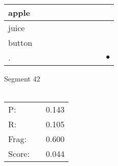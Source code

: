 \documentclass[landscape]{article}
\newcommand{\ssp}{\hspace{2pt}}
\newcommand{\mex}{\cellcolor{g}$\bullet$}
\begin{document}
\begin{tabular}{|l|p{10pt}|p{10pt}|p{10pt}|p{10pt}|p{10pt}|p{10pt}|p{10pt}|p{10pt}|p{10pt}|}
\hline
\ssp apple \ssp&\hspace{2pt}&\hspace{2pt}&\hspace{2pt}&\hspace{2pt}&\hspace{2pt}&\hspace{2pt}&\hspace{2pt}&\hspace{2pt}&\hspace{2pt}\\
\hline
\ssp juice \ssp&\hspace{2pt}&\hspace{2pt}&\hspace{2pt}&\hspace{2pt}&\hspace{2pt}&\hspace{2pt}&\hspace{2pt}&\hspace{2pt}&\hspace{2pt}\\
\hline
\ssp button \ssp&\hspace{2pt}&\hspace{2pt}&\hspace{2pt}&\hspace{2pt}&\hspace{2pt}&\hspace{2pt}&\hspace{2pt}&\hspace{2pt}&\hspace{2pt}\\
\hline
\ssp \cellcolor{ref8}. \ssp&\hspace{2pt}&\hspace{2pt}&\hspace{2pt}&\hspace{2pt}&\hspace{2pt}&\hspace{2pt}&\hspace{2pt}&\hspace{2pt}&\hspace{2pt}\mex\\
\hline
\end{tabular}

\vspace{6pt}
\noindent Segment 42\\\\
\noindent\begin{tabular}{lm{12pt}r}
\hline
P:&&0.143\\
R:&&0.105\\
Frag:&&0.600\\
Score:&&0.044\\
\end{tabular}
\end{document}
